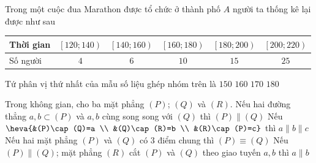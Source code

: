\begin{ex}%
	Trong một cuộc đua Marathon được tổ chức ở thành phố $A$ người ta thống kê lại được như sau
	\begin{center}
		\begin{tabular}{|l|c|c|c|c|c|}
			\hline
			Thời gian & $\left[120;140\right)$ & $\left[140;160\right)$ & $\left[160;180\right)$ & 
			$\left[180;200\right)$ & $\left[200;220\right)$ \\
			\hline
			Số người & $4$ & $6$ & $10$ & $15$ & $25$ \\
			\hline
		\end{tabular}
	\end{center}
	Tứ phân vị thứ nhất của mẫu số liệu ghép nhóm trên là
	\choice
	{$150$}
	{$160$}
	{\True $170$}
	{$180$}
\end{ex}
\cauds
\begin{ex}%
	Trong không gian, cho ba mặt phẳng $(P)$; $(Q)$ và $(R)$.
	\choiceTF
	{Nếu hai đường thẳng $a, b\subset (P)$ và $a, b$ cùng song song với $(Q)$ thì $(P)\parallel (Q)$}
	{Nếu $\heva{&(P)\cap (Q)=a \\ &(Q)\cap (R)=b \\ &(R)\cap (P)=c}$ thì $a\parallel b\parallel c$}
	{Nếu hai mặt phẳng $(P)$ và $(Q)$ có $3$ điểm chung thì $(P)\equiv (Q)$}
	{\True Nếu $(P)\parallel (Q)$; mặt phẳng $(R)$ cắt $(P)$ và $(Q)$ theo giao tuyến $a, b$ thì $a\parallel b$}
\loigiai{}
\end{ex}

